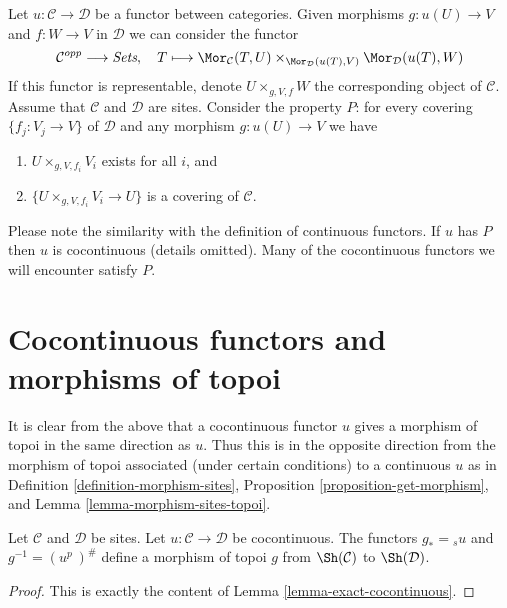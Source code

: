 \begin{remark}
\label{remark-cartesian-cocontinuous}
Let $u : \mathcal{C} \to \mathcal{D}$ be a functor between categories.
Given morphisms $g : u(U) \to V$ and $f : W \to V$ in $\mathcal{D}$
we can consider the functor
$$
\mathcal{C}^{opp} \longrightarrow \textit{Sets},\quad
T \longmapsto
\Mor_\mathcal{C}(T, U)
\times_{\Mor_\mathcal{D}(u(T), V)}
\Mor_\mathcal{D}(u(T), W)
$$
If this functor is representable, denote $U \times_{g, V, f} W$
the corresponding object of $\mathcal{C}$.
Assume that $\mathcal{C}$ and $\mathcal{D}$ are sites.
Consider the property $P$: for every covering $\{f_j : V_j \to V\}$
of $\mathcal{D}$ and any morphism $g : u(U) \to V$ we have
\begin{enumerate}
\item $U \times_{g, V, f_i} V_i$ exists for all $i$, and
\item $\{U \times_{g, V, f_i} V_i \to U\}$ is a covering of $\mathcal{C}$.
\end{enumerate}
Please note the similarity with the definition of continuous
functors. If $u$ has $P$ then $u$ is cocontinuous (details omitted).
Many of the cocontinuous functors we will encounter satisfy $P$.
\end{remark}


\section{Cocontinuous functors and morphisms of topoi}
\label{section-cocontinuous-morphism-topoi}

\noindent
It is clear from the above that a cocontinuous functor $u$
gives a morphism of topoi in the same direction as $u$.
Thus this is in the opposite direction from the morphism of topoi
associated (under certain conditions) to a continuous $u$ as in
Definition \ref{definition-morphism-sites},
Proposition \ref{proposition-get-morphism}, and
Lemma \ref{lemma-morphism-sites-topoi}.

\begin{lemma}
\label{lemma-cocontinuous-morphism-topoi}
Let $\mathcal{C}$ and $\mathcal{D}$ be sites.
Let $u : \mathcal{C} \to \mathcal{D}$ be cocontinuous.
The functors $g_* = {}_su$ and $g^{-1} = (u^p\ )^\#$
define a morphism of topoi
$g$ from  $\Sh(\mathcal{C})$ to $\Sh(\mathcal{D})$.
\end{lemma}

\begin{proof}
This is exactly the content of Lemma \ref{lemma-exact-cocontinuous}.
\end{proof}

